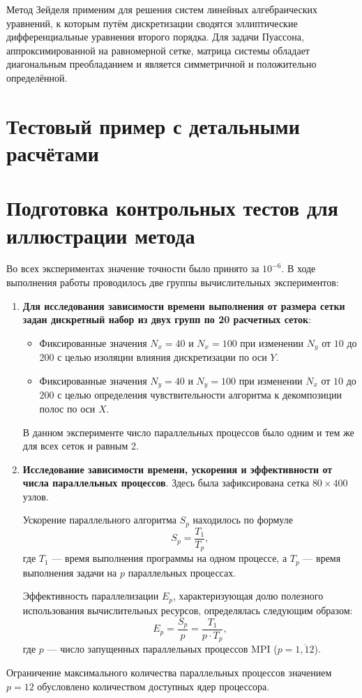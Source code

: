 Метод Зейделя применим для решения систем линейных алгебраических уравнений, к которым  путём дискретизации сводятся эллиптические дифференциальные уравнения второго порядка. Для задачи Пуассона, аппроксимированной на равномерной сетке, матрица системы обладает диагональным преобладанием и является симметричной и положительно определённой.

\section{Тестовый пример с детальными расчётами}
\label{sec:test_case}

\section{Подготовка контрольных тестов для иллюстрации метода}
Во всех экспериментах значение точности было принято за $10^{-6}$. В ходе выполнения работы проводилось две группы вычислительных экспериментов:
\begin{enumerate}
	\item \textbf{Для исследования зависимости времени выполнения от размера сетки задан дискретный набор из двух групп по 20 расчетных сеток}:
	\begin{itemize}
		\item Фиксированные значения $N_x = 40$ и $N_x = 100$ при изменении $N_y$ от $10$ до $200$ с целью изоляции влияния дискретизации по оси $Y$.
		\item Фиксированные значения $N_y = 40$ и $N_y = 100$ при изменении $N_x$ от $10$ до $200$ с целью определения чувствительности алгоритма к декомпозиции полос по оси $X$.
	\end{itemize}
	В данном эксперименте число параллельных процессов было одним и тем же для всех сеток и равным 2.
	
	\item \textbf{Исследование зависимости времени, ускорения и эффективности от числа параллельных процессов}. Здесь была зафиксирована сетка $80 \times 400$ узлов. 
	
	Ускорение параллельного алгоритма  $S_p$ находилось по формуле
	\begin{equation*}
		S_p = \frac{T_1}{T_p},
	\end{equation*}
	где $T_1$ — время выполнения программы на одном процессе, а $T_p$ — время выполнения задачи на $p$ параллельных процессах.
	
	Эффективность параллелизации $E_p$, характеризующая долю полезного использования вычислительных ресурсов, определялась следующим образом:
	\begin{equation*}
		E_p = \frac{S_p}{p} = \frac{T_1}{p \cdot T_p},
	\end{equation*}
	где $p$ — число запущенных параллельных процессов MPI ($p = \overline{1, 12}$).
\end{enumerate}
Ограничение максимального количества параллельных процессов значением $p = 12$ обусловлено количеством доступных ядер процессора. 
